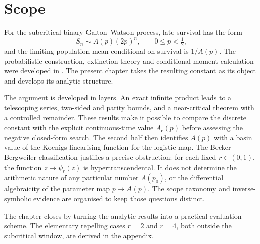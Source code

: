 \section{Scope}\label{a:sec:introduction}

For the subcritical binary Galton--Watson process, late survival has the form
\[
 S_n\sim A(p)(2p)^n,
 \qquad 0\le p<\tfrac12,
\]
and the limiting population mean conditional on survival is \(1/A(p)\).  The
probabilistic construction, extinction theory and conditional-moment calculation
were developed in \ChM.  The present chapter takes the resulting constant as its
object and develops its analytic structure.

The argument is developed in layers.  An exact infinite product leads to a
telescoping series, two-sided and parity bounds, and a near-critical theorem with a
controlled remainder.  These results make it possible to compare the discrete
constant with the explicit continuous-time value \(A_{\mathrm c}(p)\) before
assessing the negative closed-form search.  The second half then identifies
\(A(p)\) with a basin value of the Koenigs linearising function for the logistic
map.  The Becker--Bergweiler classification justifies a precise obstruction: for
each fixed \(r\in(0,1)\), the function \(z\mapsto\psi_r(z)\) is
hypertranscendental.  It does not determine the arithmetic nature of any particular
number \(A(p_0)\), or the differential algebraicity of the parameter map
\(p\mapsto A(p)\).  The scope taxonomy and inverse-symbolic evidence are organised
to keep those questions distinct.

The chapter closes by turning the analytic results into a practical evaluation
scheme.  The elementary repelling cases \(r=2\) and \(r=4\), both outside the
subcritical window, are derived in the appendix.
